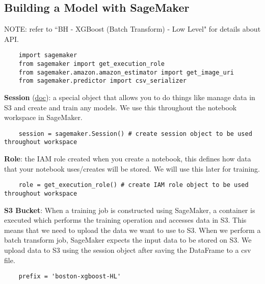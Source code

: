 \documentclass[11pt, a4paper]{article}
\begin{document}
\begin{spacing}{1.1}
	\subsection{Building a Model with SageMaker}
	\begin{center}
	\color{darkgray} NOTE: refer to ``BH - XGBoost (Batch Transform) - Low Level" for details about API. \color{black}
	\end{center}
	\begin{lstlisting}
	import sagemaker
	from sagemaker import get_execution_role
	from sagemaker.amazon.amazon_estimator import get_image_uri
	from sagemaker.predictor import csv_serializer
	\end{lstlisting}\vspace*{2mm}
	\textbf{Session} (\href{https://sagemaker.readthedocs.io/en/latest/session.html}{doc}): a special object that allows you to do things like manage data in S3 and create and train any models. We use this throughout the notebook workspace in SageMaker.
	\begin{lstlisting}
	session = sagemaker.Session() # create session object to be used throughout workspace
	\end{lstlisting}\vspace*{2mm}
	\textbf{Role}: the IAM role created when you create a notebook, this defines how data that your notebook uses/creates will be stored. We will use this later for training. 
	\begin{lstlisting}
	role = get_execution_role() # create IAM role object to be used throughout workspace
	\end{lstlisting}\vspace*{2mm}
	\textbf{S3 Bucket}: When a training job is constructed using SageMaker, a container is executed which performs the training operation and accesses data in S3. This means that we need to upload the data we want to use to S3. When we perform a batch transform job, SageMaker expects the input data to be stored on S3. We upload data to S3 using the session object after saving the DataFrame to a csv file. \newpage

	\begin{lstlisting}
	prefix = 'boston-xgboost-HL'
	

\end{lstlisting}
\end{spacing}
\end{document}
